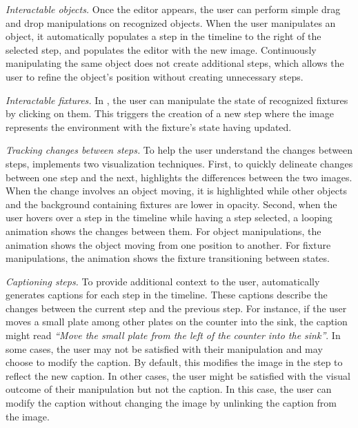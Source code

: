 
\emph{Interactable objects.} Once the editor appears, the user can perform simple drag and drop manipulations on recognized objects. When the user manipulates an object, it automatically populates a step in the timeline to the right of the selected step, and populates the editor with the new image. Continuously manipulating the same object does not create additional steps, which allows the user to refine the object's position without creating unnecessary steps.

\emph{Interactable fixtures.} In \projname, the user can manipulate the state of recognized fixtures by clicking on them. This triggers the creation of a new step where the image represents the environment with the fixture's state having updated.

\emph{Tracking changes between steps.} To help the user understand the changes between steps, \projname implements two visualization techniques. First, to quickly delineate changes between one step and the next, \projname highlights the differences between the two images. When the change involves an object moving, it is highlighted while other objects and the background containing fixtures are lower in opacity. Second, when the user hovers over a step in the timeline while having a step selected, a looping animation shows the changes between them. For object manipulations, the animation shows the object moving from one position to another. For fixture manipulations, the animation shows the fixture transitioning between states.

\emph{Captioning steps.} To provide additional context to the user, \projname automatically generates captions for each step in the timeline. These captions describe the changes between the current step and the previous step. For instance, if the user moves a small plate among other plates on the counter into the sink, the caption might read \textit{``Move the small plate from the left of the counter into the sink''}. In some cases, the user may not be satisfied with their manipulation and may choose to modify the caption. By default, this modifies the image in the step to reflect the new caption. In other cases, the user might be satisfied with the visual outcome of their manipulation but not the caption. In this case, the user can modify the caption without changing the image by unlinking the caption from the image.


